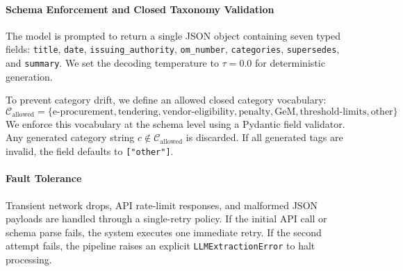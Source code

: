 \documentclass{article}
\begin{document}
\paragraph{Schema Enforcement and Closed Taxonomy Validation}
The model is prompted to return a single JSON object containing seven typed fields: \texttt{title}, \texttt{date}, \texttt{issuing\_authority}, \texttt{om\_number}, \texttt{categories}, \texttt{supersedes}, and \texttt{summary}. We set the decoding temperature to $\tau = 0.0$ for deterministic generation.

To prevent category drift, we define an allowed closed category vocabulary:
\begin{equation}
    \mathcal{C}_{\text{allowed}} = \{\text{e-procurement}, \text{tendering}, \text{vendor-eligibility}, \text{penalty}, \text{GeM}, \text{threshold-limits}, \text{other}\}
\end{equation}
We enforce this vocabulary at the schema level using a Pydantic field validator. Any generated category string $c \notin \mathcal{C}_{\text{allowed}}$ is discarded. If all generated tags are invalid, the field defaults to \texttt{["other"]}.

\paragraph{Fault Tolerance}
Transient network drops, API rate-limit responses, and malformed JSON payloads are handled through a single-retry policy. If the initial API call or schema parse fails, the system executes one immediate retry. If the second attempt fails, the pipeline raises an explicit \texttt{LLMExtractionError} to halt processing.
\end{document}
